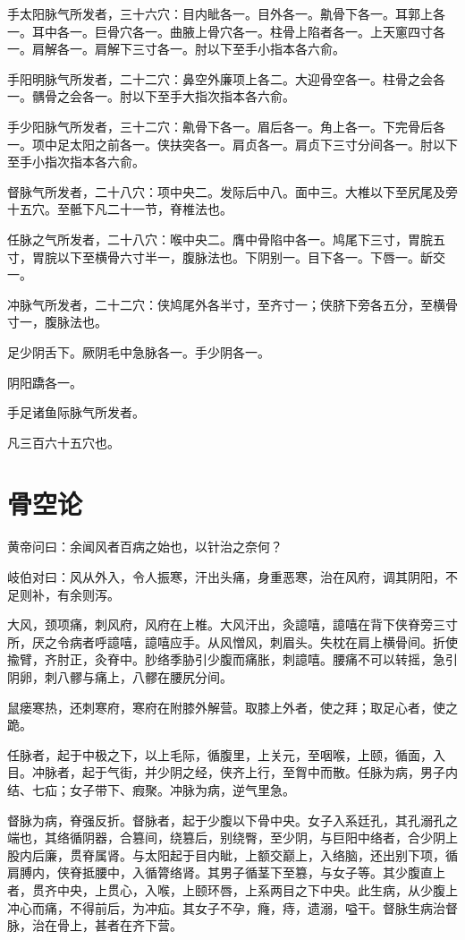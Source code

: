 \documentclass{article}%
\begin{document}
手太阳脉气所发者，三十六穴：目内眦各一。目外各一。鼽骨下各一。耳郭上各一。耳中各一。巨骨穴各一。曲腋上骨穴各一。柱骨上陷者各一。上天窻四寸各一。肩解各一。肩解下三寸各一。肘以下至手小指本各六俞。

手阳明脉气所发者，二十二穴：鼻空外廉项上各二。大迎骨空各一。柱骨之会各一。髃骨之会各一。肘以下至手大指次指本各六俞。

手少阳脉气所发者，三十二穴：鼽骨下各一。眉后各一。角上各一。下完骨后各一。项中足太阳之前各一。侠扶突各一。肩贞各一。肩贞下三寸分间各一。肘以下至手小指次指本各六俞。

督脉气所发者，二十八穴：项中央二。发际后中八。面中三。大椎以下至尻尾及旁十五穴。至骶下凡二十一节，脊椎法也。

任脉之气所发者，二十八穴：喉中央二。膺中骨陷中各一。鸠尾下三寸，胃脘五寸，胃脘以下至横骨六寸半一，腹脉法也。下阴别一。目下各一。下唇一。龂交一。

冲脉气所发者，二十二穴：侠鸠尾外各半寸，至齐寸一；侠脐下旁各五分，至横骨寸一，腹脉法也。

足少阴舌下。厥阴毛中急脉各一。手少阴各一。

阴阳蹻各一。

手足诸鱼际脉气所发者。

凡三百六十五穴也。
\section{骨空论}
黄帝问曰：余闻风者百病之始也，以针治之奈何？

岐伯对曰：风从外入，令人振寒，汗出头痛，身重恶寒，治在风府，调其阴阳，不足则补，有余则泻。

大风，颈项痛，刺风府，风府在上椎。大风汗出，灸譩嘻，譩嘻在背下侠脊旁三寸所，厌之令病者呼譩嘻，譩嘻应手。从风憎风，刺眉头。失枕在肩上横骨间。折使揄臂，齐肘正，灸脊中。䏚络季胁引少腹而痛胀，刺譩嘻。腰痛不可以转摇，急引阴卵，刺八髎与痛上，八髎在腰尻分间。

鼠瘘寒热，还刺寒府，寒府在附膝外解营。取膝上外者，使之拜；取足心者，使之跪。

任脉者，起于中极之下，以上毛际，循腹里，上关元，至咽喉，上颐，循面，入目。冲脉者，起于气街，并少阴之经，侠齐上行，至胷中而散。任脉为病，男子内结、七疝；女子带下、瘕聚。冲脉为病，逆气里急。

督脉为病，脊强反折。督脉者，起于少腹以下骨中央。女子入系廷孔，其孔溺孔之端也，其络循阴器，合篡间，绕篡后，别绕臀，至少阴，与巨阳中络者，合少阴上股内后廉，贯脊属肾。与太阳起于目内眦，上额交巅上，入络脑，还出别下项，循肩膊内，侠脊抵腰中，入循膂络肾。其男子循茎下至篡，与女子等。其少腹直上者，贯齐中央，上贯心，入喉，上颐环唇，上系两目之下中央。此生病，从少腹上冲心而痛，不得前后，为冲疝。其女子不孕，癃，痔，遗溺，嗌干。督脉生病治督脉，治在骨上，甚者在齐下营。
\end{document}
